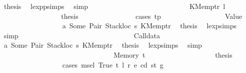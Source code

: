 \begin{isabellebody}
\ {\isacharquery}{\kern0pt}thesis\ \isamarkupfalse%
\ lexp{\isachardot}{\kern0pt}psimps{\isacharparenleft}{\kern0pt}{}{\isacharparenright}{\kern0pt}\ \isamarkupfalse%
\ simp\isanewline
\ \ \ \ \ \ \ \ \ \ \ \ \isamarkupfalse%
\isanewline
\ \ \ \ \ \ \ \ \ \ \ \ \ \ \isamarkupfalse%
\ {\isacharparenleft}{\kern0pt}KMemptr\ l{\isacharprime}{\kern0pt}{\isacharparenright}{\kern0pt}\isanewline
\ \ \ \ \ \ \ \ \ \ \ \ \ \ \isamarkupfalse%
\ \isamarkupfalse%
\ {\isacharquery}{\kern0pt}thesis\isanewline
\ \ \ \ \ \ \ \ \ \ \ \ \ \ \isamarkupfalse%
\ {\isacharparenleft}{\kern0pt}cases\ tp{\isacharparenright}{\kern0pt}\isanewline
\ \ \ \ \ \ \ \ \ \ \ \ \ \ \ \ \isamarkupfalse%
\ {\isacharparenleft}{\kern0pt}Value\ {\isacharunderscore}{\kern0pt}{\isacharparenright}{\kern0pt}\isanewline
\ \ \ \ \ \ \ \ \ \ \ \ \ \ \ \ \isamarkupfalse%
\ a{}\ Some\ Pair\ Stackloc\ s{}\ KMemptr\ \isamarkupfalse%
\ {\isacharquery}{\kern0pt}thesis\ \isamarkupfalse%
\ lexp{\isachardot}{\kern0pt}simps{\isacharparenleft}{\kern0pt}{}{\isacharparenright}{\kern0pt}\ \isamarkupfalse%
\ simp\isanewline
\ \ \ \ \ \ \ \ \ \ \ \ \ \ \isamarkupfalse%
\isanewline
\ \ \ \ \ \ \ \ \ \ \ \ \ \ \ \ \isamarkupfalse%
\ {\isacharparenleft}{\kern0pt}Calldata\ {\isacharunderscore}{\kern0pt}{\isacharparenright}{\kern0pt}\isanewline
\ \ \ \ \ \ \ \ \ \ \ \ \ \ \ \ \isamarkupfalse%
\ a{}\ Some\ Pair\ Stackloc\ s{}\ KMemptr\ \isamarkupfalse%
\ {\isacharquery}{\kern0pt}thesis\ \isamarkupfalse%
\ lexp{\isachardot}{\kern0pt}simps{\isacharparenleft}{\kern0pt}{}{\isacharparenright}{\kern0pt}\ \isamarkupfalse%
\ simp\isanewline
\ \ \ \ \ \ \ \ \ \ \ \ \ \ \isamarkupfalse%
\isanewline
\ \ \ \ \ \ \ \ \ \ \ \ \ \ \ \ \isamarkupfalse%
\ {\isacharparenleft}{\kern0pt}Memory\ t{\isacharparenright}{\kern0pt}\isanewline
\ \ \ \ \ \ \ \ \ \ \ \ \ \ \ \ \isamarkupfalse%
\ \isamarkupfalse%
\ {\isacharquery}{\kern0pt}thesis\isanewline
\ \ \ \ \ \ \ \ \ \ \ \ \ \ \ \ \isamarkupfalse%
\ {\isacharparenleft}{\kern0pt}cases\ {\isachardoublequoteopen}msel\ True\ t\ l{\isacharprime}{\kern0pt}\ r\ e\ cd\ st\ g{\isachardoublequoteclose}{\isacharparenright}{\kern0pt}\isanewline

\end{isabellebody}
